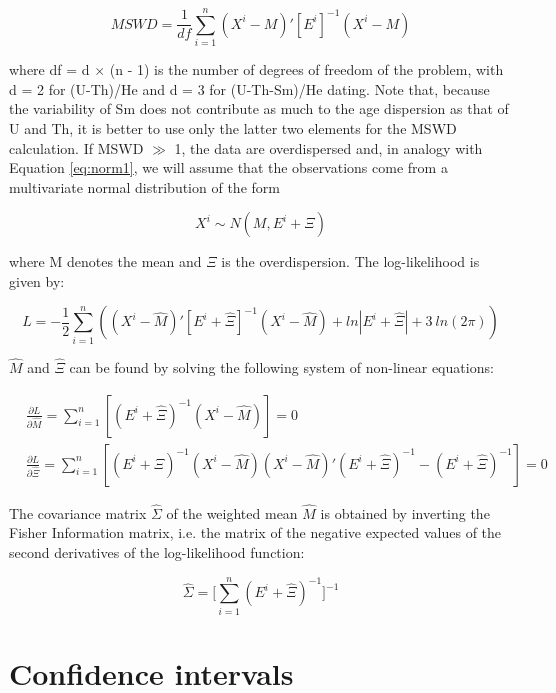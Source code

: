 \documentclass{article}
\begin{document}
\begin{equation}
MSWD = \frac{1}{df} \sum_{i=1}^n 
(X^i-M)'[E^i]^{-1}(X^i-M)
\label{eq:MSWDc}
\end{equation}

\noindent where df = d $\times$ (n - 1) is the number of degrees of freedom of
the problem, with d = 2 for (U-Th)/He and d = 3 for (U-Th-Sm)/He
dating. Note that, because the variability of Sm does not contribute
as much to the age dispersion as that of U and Th, it is better to use
only the latter two elements for the MSWD calculation. If MSWD $\gg$
1, the data are overdispersed and, in analogy with Equation
\ref{eq:norm1}, we will assume that the observations come from a
multivariate normal distribution of the form

\begin{equation}
X^i \sim N(M, E^i + \Xi)
\label{eq:norm2}
\end{equation}

\noindent where M denotes the mean and $\Xi$ is the overdispersion. 
The log-likelihood is given by:

\begin{equation}
L = - \frac{1}{2} \sum_{i=1}^n 
\left(
(X^i-\hat{M})'[E^i + \hat{\Xi}]^{-1}(X^i-\hat{M})
+ ln|E^i + \hat{\Xi}| + 3~ln(2\pi)
\right)
  \label{eq:L2}
\end{equation}

\noindent $\hat{M}$ and $\hat{\Xi}$ can be found by solving the following
system of non-linear equations:

\begin{align}
& \frac{\partial L}{\partial \hat{M}}  = 
\sum_{i=1}^n [(E^i+\hat{\Xi})^{-1}(X^i-\hat{M})] = 0
\label{eq:Lmu}\\
&\frac{\partial L}{\partial \hat{\Xi}}  =
\sum_{i=1}^n [(E^i+\hat{\Xi})^{-1}(X^i-\hat{M})(X^i-\hat{M})'(E^i+\hat{\Xi})^{-1}
- (E^i+\hat{\Xi})^{-1}] = 0 
\label{eq:Lxi}
\end{align}

The covariance matrix $\hat{\Sigma}$ of the weighted mean $\hat{M}$ is
obtained by inverting the Fisher Information matrix, i.e.  the matrix
of the negative expected values of the second derivatives of the
log-likelihood function:

\begin{equation}
\hat{\Sigma}
=
\Biggl[
\sum_{i=1}^n (E^i+\hat{\Xi})^{-1}
\Biggr]^{-1}
\label{eq:Sigma}
\end{equation}

\section{Confidence intervals} \label{sec:ci}
\end{document}
